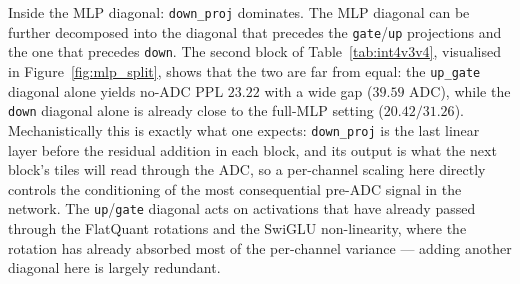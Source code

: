 \documentclass[a4paper,11pt,oneside]{article}
\theoremstyle{breakstyle}
\begin{document}
  \begin{table}[htbp]
    \centering
    \caption{INT4 diagonal placement and staged training. 1024 samples,
             $\alpha=0.5$. Values are mean $\pm$ 1$\sigma$ over 3 random
             calibration seeds, except the final staged row, which
             reports the selected checkpoint used in
             Table~\ref{tab:main_results}.}
    \label{tab:int4v3v4}
    \renewcommand{\arraystretch}{1.15}
  \end{table}

  Inside the MLP diagonal: \texttt{down\_proj} dominates.
  The MLP diagonal can be further decomposed into the diagonal that
  precedes the \texttt{gate}/\texttt{up} projections and the one
  that precedes \texttt{down}.  The second block of
  Table~\ref{tab:int4v3v4}, visualised in
  Figure~\ref{fig:mlp_split}, shows that the two are far from equal:
  the \texttt{up\_gate} diagonal alone yields no-ADC PPL $23.22$
  with a wide gap ($39.59$ ADC), while the \texttt{down} diagonal
  alone is already close to the full-MLP setting ($20.42 / 31.26$).
  Mechanistically this is exactly what one expects: \texttt{down\_proj}
  is the last linear layer before the residual addition in each
  block, and its output is what the next block's tiles will read
  through the ADC, so a per-channel scaling here directly controls
  the conditioning of the most consequential pre-ADC signal in the
  network.  The \texttt{up}/\texttt{gate} diagonal acts on
  activations that have already passed through the FlatQuant
  rotations and the SwiGLU non-linearity, where the rotation has
  already absorbed most of the per-channel variance --- adding
  another diagonal here is largely redundant.
\end{document}
